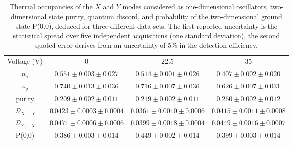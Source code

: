 \documentclass[11pt,floatfix,amssymb,prx,aps,longbibliography,superscriptaddress,nopacs]{revtex4-2}
\newcommand{\nX}{n_{\scriptstyle{x}}}
\newcommand{\nY}{n_{\scriptstyle{y}}}
\begin{document}
\begin{table}
\begin{tabular}{c||c|c|c}
Voltage  (V)  &  0 & 22.5 & 35\\
  $\nX$  &  $0.551\pm0.003\pm0.027$ & $0.514\pm0.001\pm0.026$ & $0.407\pm0.002\pm0.020$ \\
   $\nY$    &  $0.740\pm0.013\pm0.036$ & $0.716\pm0.007\pm0.036$& $0.626\pm0.007\pm0.031$  \\
 purity   & $0.209\pm0.002\pm0.011$ & $0.219\pm0.002\pm0.011$ & $0.260\pm0.002\pm0.012$ \\
 $\mathcal{D}_{X \leftarrow Y}$ & $0.0423\pm0.0003\pm0.0004$ & $0.0361\pm0.0010\pm0.0006$ & $0.0415\pm0.0011\pm0.0008$ \\
 $\mathcal{D}_{Y \leftarrow X}$ & $0.0471\pm0.0006\pm0.0006$ & $0.0399\pm0.0018\pm0.0004$  & $0.0449\pm0.0016\pm0.0007$  \\
 P(0,0) & $0.386\pm0.003\pm0.014$ & $0.449\pm0.002\pm0.014$ & $0.399\pm0.003\pm0.014$
\end{tabular}
\caption{Thermal occupancies of the $X$ and $Y$ modes considered as one-dimensional oscillators, two-dimensional state purity, quantum discord, and probability of the two-dimensional ground state P(0,0), deduced for three different data sets. The first reported uncertainty is the statistical spread over five independent acquisitions (one standard deviation), the second quoted error derives from an uncertainty of $5\%$ in the detection efficiency.}
\label{Tab_Suppl_2}
\end{table}


% 

\end{document}
